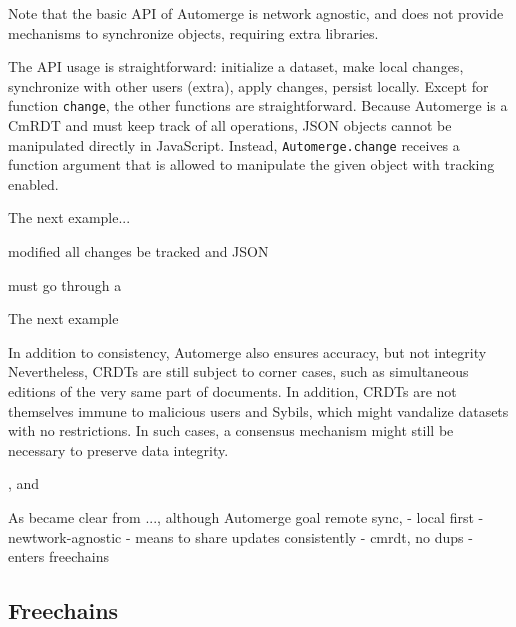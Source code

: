 \documentclass[12pt]{article}
\begin{document}
Note that the basic API of Automerge is network agnostic, and does not provide
mechanisms to synchronize objects, requiring extra libraries.

The API usage is straightforward:
    initialize a dataset,
    make local changes,
    synchronize with other users (extra),
    apply changes,
    persist locally.
Except for function \texttt{change}, the other functions are straightforward.
%
Because Automerge is a CmRDT and must keep track of all operations, JSON
objects cannot be manipulated directly in JavaScript.
Instead, \texttt{Automerge.change} receives a function argument that is allowed
to manipulate the given object with tracking enabled.

The next example...


modified
all changes be tracked and JSON

must go through a


The next example

In addition to consistency, Automerge also ensures accuracy, but not integrity
Nevertheless, CRDTs are still subject to corner cases, such as simultaneous
editions of the very same part of documents.
In addition, CRDTs are not themselves immune to malicious users and Sybils,
which might vandalize datasets with no restrictions.
In such cases, a consensus mechanism might still be necessary to preserve data
integrity.

, and

As became clear from ..., although Automerge goal remote sync,
- local first
- newtwork-agnostic
- means to share updates consistently
- cmrdt, no dups
- enters freechains


\subsection{Freechains}

%
%
\end{document}
